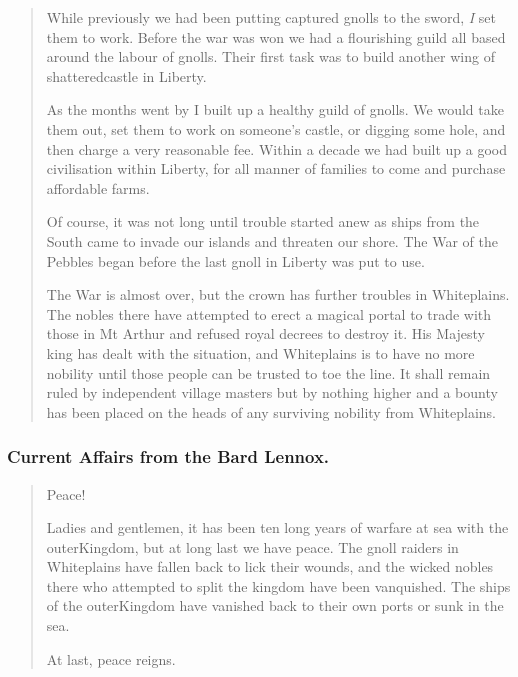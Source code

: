 \begin{multicols}{2}
\begin{quotation}
	While previously we had been putting captured gnolls to the sword, \emph{I} set them to work.
	Before the war was won we had a flourishing guild all based around the labour of gnolls.
	Their first task was to build another wing of \gls{shatteredcastle} in Liberty.

	As the months went by I built up a healthy guild of gnolls.
	We would take them out, set them to work on someone's castle, or digging some hole, and then charge a very reasonable fee.
	Within a decade we had built up a good civilisation within Liberty, for all manner of families to come and purchase affordable farms.

	Of course, it was not long until trouble started anew as ships from the South came to invade our islands and threaten our shore.
	The War of the Pebbles began before the last gnoll in Liberty was put to use.

  \label{whiteplainsWar}
	The War is almost over, but the crown has further troubles in Whiteplains.
	The nobles there have attempted to erect a magical portal to trade with those in Mt Arthur and refused royal decrees to destroy it.
	His Majesty \gls{king} has dealt with the situation, and Whiteplains is to have no more nobility until those people can be trusted to toe the line.
	It shall remain ruled by independent village masters but by nothing higher and a bounty has been placed on the heads of any surviving nobility from Whiteplains.

\end{quotation}

\subsubsection{Current Affairs from the Bard Lennox.}

\begin{quotation}

	Peace!

	Ladies and gentlemen, it has been ten long years of warfare at sea with the \gls{outerKingdom}, but at long last we have peace.
	The gnoll raiders in Whiteplains have fallen back to lick their wounds, and the wicked nobles there who attempted to split the kingdom have been vanquished.
	The ships of the \gls{outerKingdom} have vanished back to their own ports or sunk in the sea.

	At last, peace reigns.

\end{quotation}

\end{multicols}
